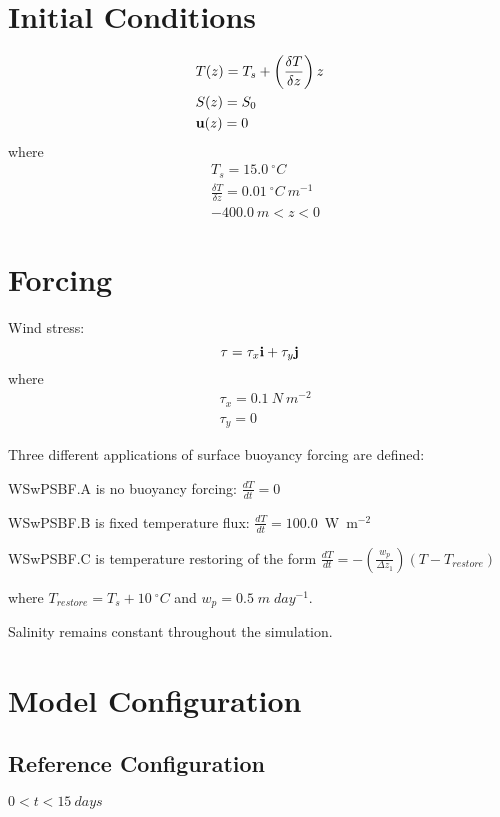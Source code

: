 \documentclass[fleqn, 12pt]{report}
\begin{document}
\section{Initial Conditions}

\begin{align*}
&T(z) = T_s + \left( \frac{\delta T}{\delta z} \right) z  \\
&S(z) = S_0 \\
&{\bf u}(z) = 0
\end{align*}
where
\begin{align*}
&T_s=15.0 \ ^{\circ}C \\
&\frac{\delta T}{\delta z}=0.01 \ ^{\circ}C \ m^{-1} \\
&-400.0 \ m <z<0
\end{align*}
\section{Forcing}

Wind stress:
\begin{equation*}
{\bf \tau} = \tau_x {\bf i} + \tau_y {\bf j} \\
\end{equation*}
where
\begin{align*}
&\tau_x= 0.1 \ N \ m^{-2} \\
&\tau_y=0
\end{align*}

Three different applications of surface buoyancy forcing are defined:

WSwPSBF.A is no buoyancy forcing: $\frac{d T}{dt} =0$

WSwPSBF.B is fixed temperature flux: $\frac{d T}{dt} = 100.0$~W~m$^{-2}$

WSwPSBF.C is temperature restoring of the form $\frac{d T}{dt} = - \left( \frac{w_p}{\Delta z_1} \right) \left(T - T_{restore} \right)$

where $T_{restore}=T_s+10\ ^{\circ}C$ and $w_p = 0.5 \;m\;day^{-1}$.

Salinity remains constant throughout the simulation.

\section{Model Configuration}
\subsection{Reference Configuration}
 $0<t<15~days$
\end{document}
